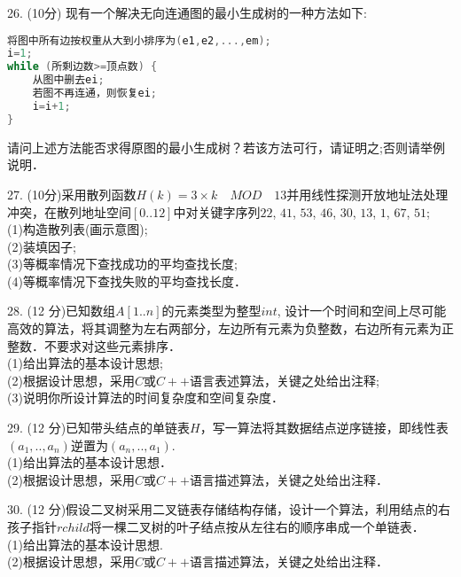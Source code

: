 26. (10分) 现有一个解决无向连通图的最小生成树的一种方法如下: \\
\begin{lstlisting}[language=cpp]
将图中所有边按权重从大到小排序为(e1,e2,...,em);
i=1;
while (所剩边数>=顶点数) {
    从图中删去ei;
    若图不再连通，则恢复ei;
    i=i+1;
}
\end{lstlisting}
请问上述方法能否求得原图的最小生成树？若该方法可行，请证明之;否则请举例说明．

27. (10分)采用散列函数$H(k)=3\times k \quad MOD \quad 13$并用线性探测开放地址法处理冲突，在散列地址空间$[0..12]$中对关键字序列$22$, $41$, $53$, $46$, $30$, $13$, $1$, $67$, $51$; \\
(1)构造散列表(画示意图); \\
(2)装填因子; \\
(3)等概率情况下查找成功的平均查找长度; \\
(4)等概率情况下查找失败的平均查找长度．

28. (12 分)已知数组$A[1..n]$的元素类型为整型$int$, 设计一个时间和空间上尽可能高效的算法，将其调整为左右两部分，左边所有元素为负整数，右边所有元素为正整数．不要求对这些元素排序． \\
(1)给出算法的基本设计思想; \\
(2)根据设计思想，采用$C$或$C++$语言表述算法，关键之处给出注释; \\
(3)说明你所设计算法的时间复杂度和空间复杂度．

29. (12 分)已知带头结点的单链表$H$，写一算法将其数据结点逆序链接，即线性表$(a_1,..,a_n)$逆置为$(a_n,..,a_1)$. \\
(1)给出算法的基本设计思想． \\
(2)根据设计思想，采用$C$或$C++$语言描述算法，关键之处给出注释．

30. (12 分)假设二叉树采用二叉链表存储结构存储，设计一个算法，利用结点的右孩子指针$rchild$将一棵二叉树的叶子结点按从左往右的顺序串成一个单链表． \\
(1)给出算法的基本设计思想. \\
(2)根据设计思想，采用$C$或$C++$语言描述算法，关键之处给出注释．